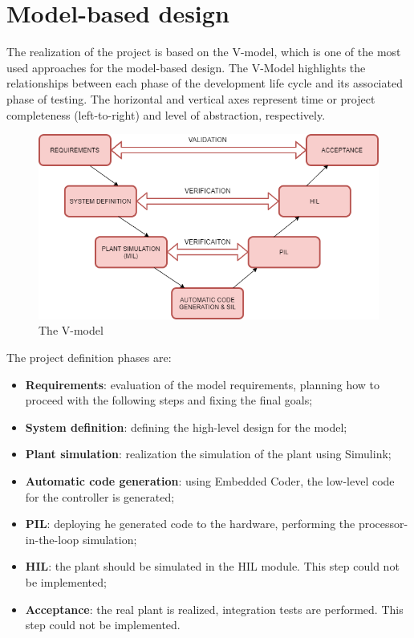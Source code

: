 \documentclass[12pt,a4paper]{report}
\begin{document}
\section{Model-based design}
The realization of the project is based on the V-model, which is one of the most used approaches for the model-based design. The V-Model highlights the relationships between each phase of the development life cycle and its associated phase of testing.  The horizontal and vertical axes represent time or project completeness (left-to-right) and level of abstraction, respectively. \\
\begin{figure}[htbp]
	\centering
	\includegraphics[scale=0.6]{v-model.png}
	\caption{The V-model}
\end{figure}
\FloatBarrier
The project definition phases are:
\begin{itemize}
	\item \textbf{Requirements}: evaluation of the model requirements, planning how to proceed with the following steps and fixing the final goals;
	\item \textbf{System definition}: defining the high-level design for the model;
	\item \textbf{Plant simulation}: realization the simulation of the plant using Simulink;
	\item \textbf{Automatic code generation}: using Embedded Coder, the low-level code for the controller is generated;
	\item \textbf{PIL}: deploying he generated code to the hardware, performing the processor-in-the-loop simulation;
	\item \textbf{HIL}: the plant should be simulated in the HIL module. This step could not be implemented;
	\item \textbf{Acceptance}: the real plant is realized, integration tests are performed. This step could not be implemented.
\end{itemize}
\FloatBarrier
\end{document}
